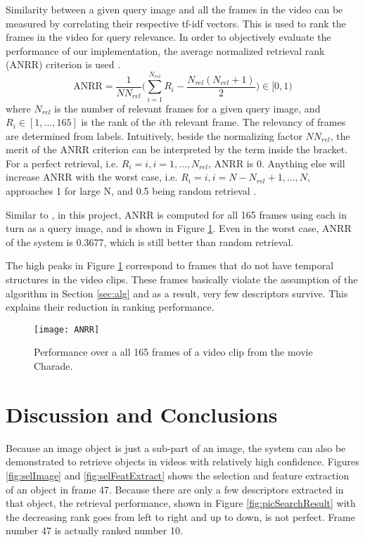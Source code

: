 \documentclass[conference]{IEEEtran}
\begin{document}
Similarity between a given query image and all the frames in the video can be measured by correlating their respective tf-idf vectors. This is used to rank
the frames in the video for query relevance. In order to objectively evaluate the performance of our implementation, the average normalized retrieval rank (ANRR) criterion
is used \cite{muller2002truth}.
$$
\text{ANRR} = \frac{1}{NN_{rel}} \big( \sum_{i = 1}^{N_{rel}} R_i - \frac{N_{rel}(N_{rel}+1)}{2} \big) \in [0, 1)
$$
where $N_{rel}$ is the number of relevant frames for a given query image, and $R_{i} \in [1, \dots, 165]$ is the rank of the $i$th relevant frame.
The relevancy of frames are determined from labels.
Intuitively, beside the normalizing factor $NN_{rel}$, the merit of the ANRR criterion can be interpreted by the term inside the bracket. 
For a perfect retrieval, i.e.
$R_i = i, i = 1, \dots, N_{rel}$, ANRR is 0. Anything else will increase ANRR with the worst case, i.e. $R_i = i, i = N-N_{rel}+1, \dots, N$, 
approaches 1 for large N, and 0.5 being random 
retrieval \cite{muller2002truth}.

Similar to \cite{sivic2003video}, in this project, ANRR is computed for all 165 frames using each in turn  as a query image, and is shown in Figure \ref{fig:anrr}.
Even in the worst case, ANRR of the system is 0.3677, which is still better than random retrieval.

The high peaks in Figure \ref{fig:anrr} correspond to frames that do not have temporal structures in the video clips. 
These frames basically violate the assumption of the algorithm in Section \ref{sec:alg} and as a result, very few descriptors survive. 
This explains their reduction in ranking performance.


\begin{figure}[!t]
\centering
\texttt{[image: ANRR]}
\caption{Performance over a all 165 frames of a video clip from the movie Charade.}
\label{fig:anrr}
\end{figure}


\section{Discussion and Conclusions}
\label{sec:concl}

Because an image object is just a sub-part of an image, the system can also be demonstrated to retrieve objects in videos with 
relatively high confidence. Figures \ref{fig:selImage} and \ref{fig:selFeatExtract} shows the selection and feature extraction of an object
in frame 47. Because there are only a few descriptors extracted in that object, the retrieval performance, shown in 
Figure \ref{fig:picSearchResult} with the decreasing rank goes from left to right and up to down, 
is not perfect. Frame number 47 is actually ranked number 10.
\end{document}
